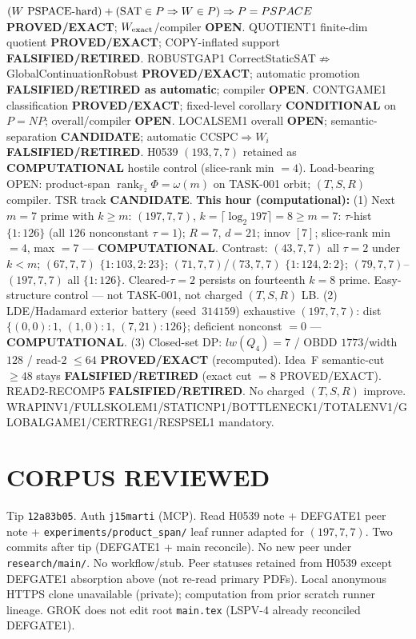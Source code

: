 \documentclass[11pt]{article}
\begin{document}
$(W\text{ PSPACE-hard})+({\rm SAT}\in P\Rightarrow W\in P)\Rightarrow P=PSPACE$
\textbf{PROVED/EXACT}; $W_{\rm exact}$/compiler \textbf{OPEN}.
QUOTIENT1 finite-dim quotient \textbf{PROVED/EXACT}; COPY-inflated support \textbf{FALSIFIED/RETIRED}.
ROBUSTGAP1 CorrectStaticSAT$\not\Rightarrow$GlobalContinuationRobust \textbf{PROVED/EXACT};
automatic promotion \textbf{FALSIFIED/RETIRED as automatic}; compiler \textbf{OPEN}.
CONTGAME1 classification \textbf{PROVED/EXACT}; fixed-level corollary \textbf{CONDITIONAL} on $P=NP$;
overall/compiler \textbf{OPEN}.
LOCALSEM1 overall \textbf{OPEN}; semantic-separation \textbf{CANDIDATE}; automatic CCSPC$\Rightarrow W_i$
\textbf{FALSIFIED/RETIRED}.
H0539 $(193,7,7)$ retained as \textbf{COMPUTATIONAL} hostile control (slice-rank min $=4$).
Load-bearing OPEN: product-span $\operatorname{rank}_{\mathbb F_2}\Phi=\omega(m)$ on TASK-001 orbit;
$(T,S,R)$ compiler. TSR track \textbf{CANDIDATE}.
\textbf{This hour (computational):}
(1) Next $m{=}7$ prime with $k{\ge}m$: $(197,7,7)$, $k=\lceil\log_2 197\rceil=8{\ge}m{=}7$:
$\tau$-hist $\{1{:}126\}$ (all $126$ nonconstant $\tau{=}1$); $R{=}7$, $d{=}21$; innov $[7]$;
slice-rank min $=4$, max $=7$ --- \textbf{COMPUTATIONAL}.
Contrast: $(43,7,7)$ all $\tau{=}2$ under $k{<}m$; $(67,7,7)$ $\{1{:}103,2{:}23\}$;
$(71,7,7)$/$(73,7,7)$ $\{1{:}124,2{:}2\}$; $(79,7,7)$--$(197,7,7)$ all $\{1{:}126\}$.
Cleared-$\tau{=}2$ persists on fourteenth $k{=}8$ prime. Easy-structure control --- not TASK-001,
not charged $(T,S,R)$ LB.
(2) LDE/Hadamard exterior battery (seed~$314159$) exhaustive $(197,7,7)$:
dist $\{(0,0){:}1,\,(1,0){:}1,\,(7,21){:}126\}$; deficient nonconst $=0$ --- \textbf{COMPUTATIONAL}.
(3) Closed-set DP: $lw(Q_4)=7$ / OBDD $1773$/width $128$ / read-$2$ $\le64$
\textbf{PROVED/EXACT} (recomputed).
Idea~F semantic-cut $\ge48$ stays \textbf{FALSIFIED/RETIRED} (exact cut $=8$ PROVED/EXACT).
READ2-RECOMP5 \textbf{FALSIFIED/RETIRED}. No charged $(T,S,R)$ improve.
WRAPINV1/FULLSKOLEM1/STATICNP1/BOTTLENECK1/TOTALENV1/GLOBALGAME1/CERTREG1/RESPSEL1 mandatory.

\section*{CORPUS REVIEWED}
Tip \texttt{12a83b05}. Auth \texttt{j15marti} (MCP). Read H0539 note + DEFGATE1 peer note +
\texttt{experiments/product\_span/} leaf runner adapted for $(197,7,7)$.
Two commits after tip (DEFGATE1 + main reconcile). No new peer under \texttt{research/main/}.
No workflow/stub. Peer statuses retained from H0539 except DEFGATE1 absorption above
(not re-read primary PDFs). Local anonymous HTTPS clone unavailable (private);
computation from prior scratch runner lineage.
GROK does not edit root \texttt{main.tex} (LSPV-4 already reconciled DEFGATE1).
\end{document}
